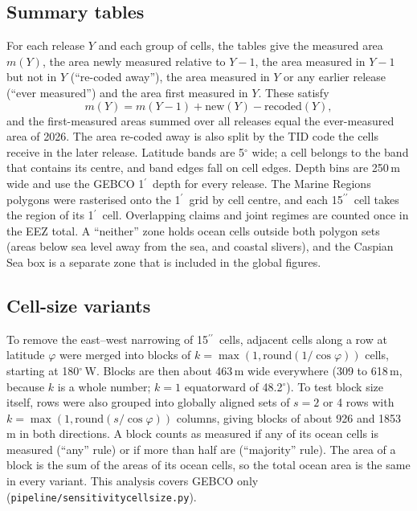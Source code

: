 \documentclass[essd, manuscript]{copernicus}
\newcommand{\as}{$^{\prime\prime}$}      %
\newcommand{\am}{$^{\prime}$}            %
\renewcommand{\_}{\usorig\allowbreak}
\begin{document}
\subsection{Summary tables}

For each release $Y$ and each group of cells, the tables give the measured area $m(Y)$, the area newly measured relative to $Y - 1$, the area measured in $Y - 1$ but not in $Y$ (``re-coded away''), the area measured in $Y$ or any earlier release (``ever measured'') and the area first measured in $Y$.
These satisfy
\begin{equation}
m(Y) = m(Y-1) + \mathrm{new}(Y) - \mathrm{recoded}(Y),
\label{eq:bookkeeping}
\end{equation}
and the first-measured areas summed over all releases equal the ever-measured area of 2026.
The area re-coded away is also split by the TID code the cells receive in the later release.
Latitude bands are 5$^\circ$ wide; a cell belongs to the band that contains its centre, and band edges fall on cell edges.
Depth bins are 250\,m wide and use the GEBCO\_2026 1\am\ depth for every release.
The Marine Regions polygons were rasterised onto the 1\am\ grid by cell centre, and each 15\as\ cell takes the region of its 1\am\ cell.
Overlapping claims and joint regimes are counted once in the EEZ total.
A ``neither'' zone holds ocean cells outside both polygon sets (areas below sea level away from the sea, and coastal slivers), and the Caspian Sea box is a separate zone that is included in the global figures.

\subsection{Cell-size variants}
\label{sec:methods_cellsize}

To remove the east--west narrowing of 15\as\ cells, adjacent cells along a row at latitude $\varphi$ were merged into blocks of $k = \max(1, \mathrm{round}(1/\cos\varphi))$ cells, starting at 180$^\circ$\,W.
Blocks are then about 463\,m wide everywhere (309 to 618\,m, because $k$ is a whole number; $k = 1$ equatorward of 48.2$^\circ$).
To test block size itself, rows were also grouped into globally aligned sets of $s = 2$ or 4 rows with $k = \max(1, \mathrm{round}(s/\cos\varphi))$ columns, giving blocks of about 926 and 1853\,m in both directions.
A block counts as measured if any of its ocean cells is measured (``any'' rule) or if more than half are (``majority'' rule).
The area of a block is the sum of the areas of its ocean cells, so the total ocean area is the same in every variant.
This analysis covers GEBCO\_2026 only (\texttt{pipeline/sensitivity\_cellsize.py}).
\end{document}
